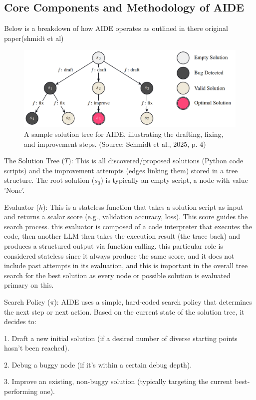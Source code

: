 \subsection{Core Components and Methodology of AIDE}
Below is a breakdown of how AIDE operates as outlined in there original paper(shmidt et al)
\begin{figure}
    \centering
    \includegraphics[width=0.8\linewidth]{images/aide-solution-tree.png}
    \caption{A sample solution tree for AIDE, illustrating the drafting, fixing, and improvement steps. (Source: Schmidt et al., 2025, p. 4)}
    \label{fig:enter-label}
\end{figure}

The Solution Tree ($T$): This is all discovered/proposed solutions (Python code scripts) and the improvement attempts (edges linking them) stored in a tree structure. The root solution ($s_0$) is typically an empty script, a node with value 'None'.

Evaluator ($h$): This is a stateless function that takes a solution script as input and returns a scalar score (e.g., validation accuracy, loss). This score guides the search process. this evaluator is composed of a code interpreter that executes the code, then another LLM then takes the execution result (the trace back) and produces a structured output via function calling. this particular role is considered stateless since it always produce the same score, and it does not include past attempts in its evaluation, and this is important in the overall tree search for the best solution as every node or possible solution is evaluated primary on this.

Search Policy ($\pi$): AIDE uses a simple, hard-coded search policy that determines the next step or next action. Based on the current state of the solution tree, it decides to:

1. Draft a new initial solution (if a desired number of diverse starting points hasn't been reached).

2. Debug a buggy node (if it's within a certain debug depth).

3. Improve an existing, non-buggy solution (typically targeting the current best-performing one).


